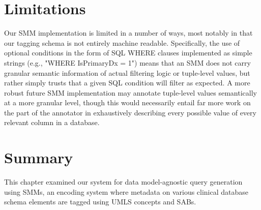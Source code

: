 \documentclass[../main.tex]{subfiles}
\begin{document}
\section{Limitations}

Our SMM implementation is limited in a number of ways, most notably in that our tagging schema is not entirely machine readable. Specifically, the use of optional conditions in the form of SQL WHERE clauses implemented as simple strings (e.g., "WHERE IsPrimaryDx = 1") means that an SMM does not carry granular semantic information of actual filtering logic or tuple-level values, but rather simply trusts that a given SQL condition will filter as expected. A more robust future SMM implementation may annotate tuple-level values semantically at a more granular level, though this would necessarily entail far more work on the part of the annotator in exhaustively describing every possible value of every relevant column in a database.

\section{Summary}

This chapter examined our system for data model-agnostic query generation using SMMs, an encoding system where metadata on various clinical database schema elements are tagged using UMLS concepts and SABs. 
\end{document}
